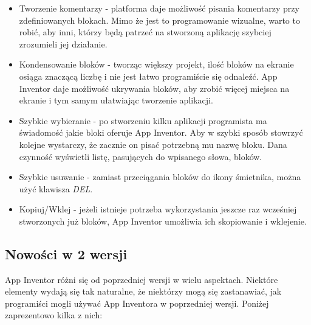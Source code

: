 \begin{itemize}
\item Tworzenie komentarzy - platforma daje możliwość pisania komentarzy przy zdefiniowanych blokach. Mimo że jest to programowanie wizualne, warto to robić, aby inni, którzy będą patrzeć na stworzoną aplikację szybciej zrozumieli jej działanie.
\item Kondensowanie bloków - tworząc większy projekt, ilość bloków na ekranie osiąga znaczącą liczbę i nie jest łatwo programiście się odnaleźć. App Inventor daje możliwość ukrywania bloków, aby zrobić więcej miejsca na ekranie i tym samym ułatwiając tworzenie aplikacji.
\item Szybkie wybieranie - po stworzeniu kilku aplikacji programista ma świadomość jakie bloki oferuje App Inventor. Aby w szybki sposób stowrzyć kolejne wystarczy, że zacznie on pisać potrzebną mu nazwę bloku. Dana czynność wyświetli listę, pasujących do wpisanego słowa, bloków.
\item Szybkie usuwanie - zamiast przeciągania bloków do ikony śmietnika, można użyć klawisza \emph{DEL}.
\item Kopiuj/Wklej - jeżeli istnieje potrzeba wykorzystania jeszcze raz wcześniej stworzonych już bloków, App Inventor umożliwia ich skopiowanie i wklejenie.
\end{itemize}

\subsection{Nowości w 2 wersji}

App Inventor różni się od poprzedniej wersji w wielu aspektach.\cite{android:43} Niektóre elementy wydają się tak naturalne, że niektórzy mogą się zastanawiać, jak programiści mogli używać App Inventora w poprzedniej wersji. Poniżej zaprezentowo kilka z nich:

